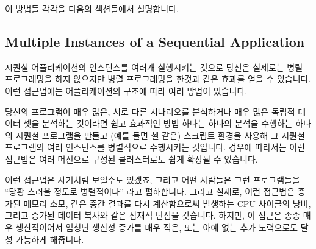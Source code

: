 이 방법들 각각을 다음의 섹션들에서 설명합니다.


\subsection{Multiple Instances of a Sequential Application}
\label{sec:intro:Multiple Instances of a Sequential Application}

시퀀셜 어플리케이션의 인스턴스를 여러개 실행시키는 것으로 당신은 실제로는 병렬
프로그래밍을 하지 않으지만 병렬 프로그래밍을 한것과 같은 효과를 얻을 수
있습니다.
이런 접근법에는 어플리케이션의 구조에 따라 여러 방법이 있습니다.


당신의 프로그램이 매우 많은, 서로 다른 시나리오를 분석하거나 매우 많은 독립적
데이터 셋을 분석하는 것이라면 쉽고 효과적인 방법 하나는 하나의 분석을 수행하는
하나의 시퀀셜 프로그램을 만들고 (예를 들면  셸 같은) 스크립트 환경을
사용해 그 시퀀셜 프로그램의 여러 인스턴스를 병렬적으로 수행시키는 것입니다.
경우에 따라서는 이런 접근법은 여러 머신으로 구성된 클러스터로도 쉽게 확장될 수
있습니다.


이런 접근법은 사기처럼 보일수도 있겠죠, 그리고 어떤 사람들은 그런 프로그램들을
``당황 스러울 정도로 병렬적이다'' 라고 폄하합니다.
그리고 실제로, 이런 접근법은 증가된 메모리 소모, 같은 중간 결과를 다시
계산함으로써 발생하는 CPU 사이클의 낭비, 그리고 증가된 데이터 복사와 같은
잠재적 단점을 갖습니다.
하지만, 이 접근은 종종 매우 생산적이어서 엄청난 생산성 증가를 매우 적은, 또는
아예 없는 추가 노력으로도 달성 가능하게 해줍니다.


